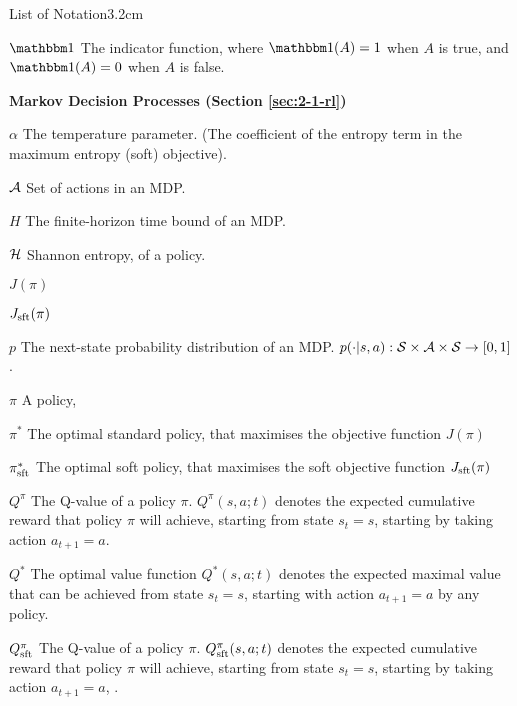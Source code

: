 \begin{mclistof}{List of Notation}{3.2cm}


    \item[$\one$] 
        The indicator function, where $\one(A)=1$ when $A$ is true, and $\one(A)=0$ when $A$ is false. 
    \\
    \item[\Large\textbf{Markov Decision Processes (Section \ref{sec:2-1-rl})}\hfill\hfill]
    \item[$\alpha$] 
        The temperature parameter. (The coefficient of the entropy term in the maximum entropy (soft) objective).
    \item[$\mathcal{A}$] 
        Set of actions in an MDP.
    \item[$H$] 
        The finite-horizon time bound of an MDP. 
    \item[$\mathcal{H}$]
        Shannon entropy, of a policy.
    \item[$J(\pi)$] 
    \item[$J_{\textnormal{sft}}(\pi)$] 
    \item[$p$] 
        The next-state probability distribution of an MDP.  $p(\cdot | s,a) : \mathcal{S} \times \mathcal{A} \times \mathcal{S} \rightarrow [0,1]$.
    \item[$\pi$]
        A policy, 
    \item[$\pi^*$]
        The optimal standard policy, that maximises the objective function $J(\pi)$
    \item[$\pi_{\textnormal{sft}}^*$]
        The optimal soft policy, that maximises the soft objective function $J_{\textnormal{sft}}(\pi)$
    \item[$Q^{\pi}$]
        The Q-value of a policy $\pi$. $Q^{\pi}(s,a;t)$ denotes the expected cumulative reward that policy $\pi$ will achieve, starting from state $s_t=s$, starting by taking action $a_{t+1}=a$.
    \item[$Q^*$]
        The optimal value function $Q^*(s,a;t)$ denotes the expected maximal value that can be achieved from state $s_t=s$, starting with action $a_{t+1}=a$ by any policy.
    \item[$Q_{\textnormal{sft}}^{\pi}$]
        The Q-value of a policy $\pi$. $Q_{\textnormal{sft}}^{\pi}(s,a;t)$ denotes the expected cumulative reward that policy $\pi$ will achieve, starting from state $s_t=s$, starting by taking action $a_{t+1}=a$, . 

\end{mclistof}
